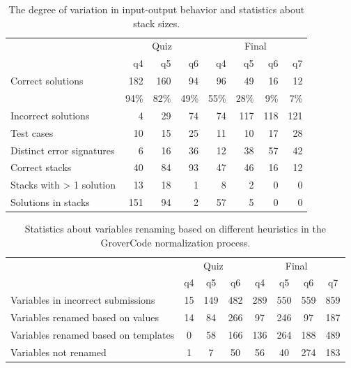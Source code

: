 \begin{table}[!ht]
\centering
\begin{tabular}{l r|r|r|r|r|r|r}
& \multicolumn{3}{c}{Quiz} & \multicolumn{4}{c}{Final} \\
& q4 & q5 & q6 & q4 & q5 & q6 & q7 \\
\hline
Correct solutions & 182 & 160 & 94 & 96 & 49 & 16 & 12 \\
 & 94\% & 82\% & 49\% & 55\% & 28\% & 9\% & 7\% \\
\hline
Incorrect solutions & 4 & 29 & 74 & 74 & 117 & 118 & 121 \\
\hline
Test cases & 10 & 15 & 25 & 11 & 10 & 17 & 28 \\
\hline
Distinct error signatures & 6 & 16 & 36 & 12 & 38 & 57 & 42 \\
\hline
Correct stacks & 40 & 84 & 93 & 47 & 46 & 16 & 12 \\
\hline
Stacks with > 1 solution & 13 & 18 & 1 & 8 & 2 & 0 & 0 \\
\hline
Solutions in stacks & 151 & 94 & 2 & 57 & 5 & 0 & 0 \\
\end{tabular}
\caption{The degree of variation in input-output behavior and statistics about stack sizes.}
\label{table:cluster_stats}
\end{table}

\begin{table}
\centering
\begin{tabular}{l c|c|c|c|c|c|c}
& \multicolumn{3}{c}{Quiz} & \multicolumn{4}{c}{Final} \\
& q4 & q5 & q6 & q4 & q5 & q6 & q7 \\
\hline
Variables in incorrect submissions & 15 & 149 & 482 & 289 & 550 & 559 & 859 \\
\hline
Variables renamed based on values & 14 & 84 & 266 & 97 & 246 & 97 & 187 \\
\hline
Variables renamed based on templates & 0 & 58 & 166 & 136 & 264 & 188 & 489 \\
\hline
Variables not renamed & 1 & 7 & 50 & 56 & 40 & 274 & 183 \\
\end{tabular}
\caption{Statistics about variables renaming based on different heuristics in the GroverCode normalization process.}
\label{table:renametype}
\end{table}
 
